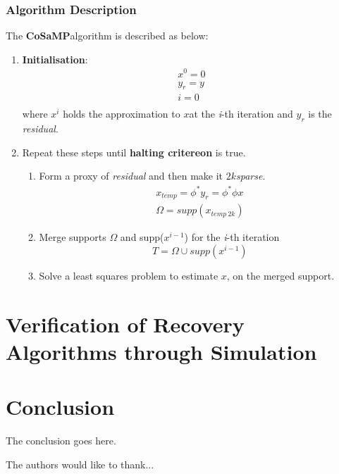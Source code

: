 \documentclass[12pt]{article}
\theoremstyle{definition}
\def\sparse{\textit{sparse}\hspace{0.1in}}
\def\x{$x$\hspace{0.1in}}
\def\cosamp{\textbf{CoSaMP}\hspace{0.1in}}
\begin{document}
\subsubsection{Algorithm Description}
The \cosamp algorithm is described as below:
\begin{enumerate}
 \item \textbf{Initialisation}:
 \begin{eqnarray}
  x^0 = 0 \\
  y_r = y \\
  i = 0 \\
 \end{eqnarray}
  where $x^i$ holds the approximation to \x at the \textit{i}-th iteration and $y_r$ is the \textit{residual}.
  
  \item Repeat these steps until \textbf{halting critereon} is true.
  \begin{enumerate}
   \item Form a proxy of \textit{residual} and then make it $2k$\sparse.
   \begin{eqnarray}
    x_{temp} = \phi^\ast y_r = \phi^\ast \phi x \\
    \Omega = supp(x_{temp \ 2k})
   \end{eqnarray}
   
  \item Merge supports $\Omega$ and supp($x^{i-1}$) for the \textit{i}-th iteration
  \begin{equation}
   T = \Omega \cup supp(x^{i-1})
  \end{equation}

  \item Solve a least squares problem to estimate \x, on the merged support.
  
  \end{enumerate}
  
\end{enumerate}

\section{Verification of Recovery Algorithms through Simulation}
\section{Conclusion}
The conclusion goes here.

The authors would like to thank...\cite{Whitmore-survey} \cite{Huang-DGS}




\end{document}
